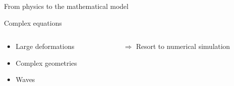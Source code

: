 \begin{withoutheadline}
\begin{frame}{From physics to the mathematical model}
\begin{overprint}
    \vspace{0.5cm}
    \begin{block}{Complex equations }
      \begin{columns}
        \begin{column}{0.5\textwidth}
          \begin{itemize}
          \item Large deformations
          \item Complex geometries
          \item Waves
          \end{itemize}
        \end{column}
        \begin{column}{0.5\textwidth}
          \begin{itemize}
          \item[] 
          \item[$\Rightarrow$]  Resort to numerical simulation
          \item[]
          \end{itemize}
        \end{column}
      \end{columns}
    \end{block}
  \end{overprint}
\end{frame}\end{withoutheadline}


